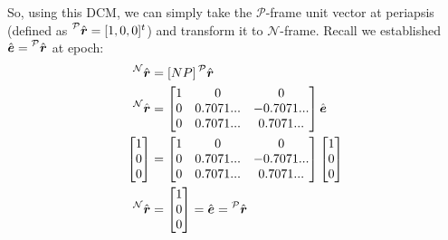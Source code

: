 \documentclass[titlepage]{article}
\begin{document}
So, using this DCM, we can simply take the $\mathcal{P}$-frame unit vector at periapsis (defined as $\prescript{\mathcal{P}}{}{\hat{\boldsymbol{r}}}=[1,0,0]^t$) and transform it to $\mathcal{N}$-frame. Recall we established $\hat{\boldsymbol{e}}=\prescript{\mathcal{P}}{}{\hat{\boldsymbol{r}}}$ at epoch:
\begin{equation}
	\begin{split}
		\prescript{\mathcal{N}}{}{\hat{\boldsymbol{r}}}&=[NP]\prescript{\mathcal{P}}{}{\hat{\boldsymbol{r}}} \\
		\prescript{\mathcal{N}}{}{\hat{\boldsymbol{r}}}&=
		\begin{bmatrix}
			1 & 0 & 0\\
			0 & 0.7071... & -0.7071... \\
			0 & 0.7071... & 0.7071...
		\end{bmatrix}\hat{\boldsymbol{e}} \\
		\begin{bmatrix}
			1 \\
			0 \\
			0 \\
		\end{bmatrix}&=
		\begin{bmatrix}
			1 & 0 & 0\\
			0 & 0.7071... & -0.7071... \\
			0 & 0.7071... & 0.7071...
		\end{bmatrix}
		\begin{bmatrix}
			1 \\
			0 \\
			0 \\
		\end{bmatrix}\\
		\prescript{\mathcal{N}}{}{\hat{\boldsymbol{r}}}&=
		\begin{bmatrix}
			1 \\
			0 \\
			0 \\
		\end{bmatrix}=\hat{\boldsymbol{e}}=\prescript{\mathcal{P}}{}{\hat{\boldsymbol{r}}} \\
	\end{split}
\end{equation}
\end{document}
